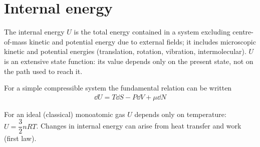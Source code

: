 \section{Internal energy}

	The internal energy $U$ is the total energy contained in a system excluding centre-of-mass kinetic and potential energy due to external fields; it includes microscopic kinetic and potential energies (translation, rotation, vibration, intermolecular). $U$ is an extensive state function: its value depends only on the present state, not on the path used to reach it.
	
	For a simple compressible system the fundamental relation can be written
	\begin{align*}
		\dd{U}=T\dd{S}-P\dd{V}+\mu\dd{N}
	\end{align*}
	
	For an ideal (classical) monoatomic gas $U$ depends only on temperature: $U=\dfrac{3}{2}nRT$. Changes in internal energy can arise from heat transfer and work (first law).